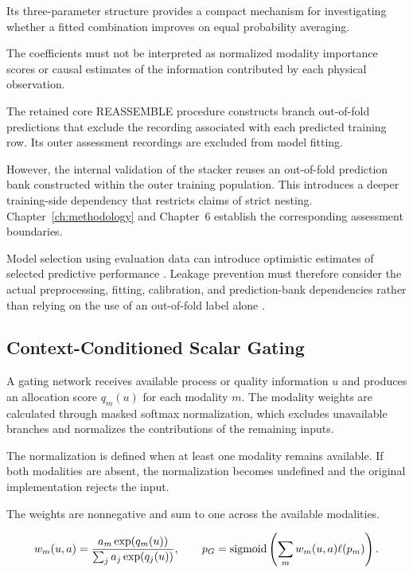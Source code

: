Its three-parameter structure provides a compact mechanism for investigating whether a fitted combination improves on equal probability averaging.

The coefficients must not be interpreted as normalized modality importance scores or causal estimates of the information contributed by each physical observation.

The retained core REASSEMBLE procedure constructs branch out-of-fold predictions that exclude the recording associated with each predicted training row. Its outer assessment recordings are excluded from model fitting.

However, the internal validation of the stacker reuses an out-of-fold prediction bank constructed within the outer training population. This introduces a deeper training-side dependency that restricts claims of strict nesting. Chapter~\ref{ch:methodology} and Chapter~6 establish the corresponding assessment boundaries.

Model selection using evaluation data can introduce optimistic estimates of selected predictive performance \parencite{P004}. Leakage prevention must therefore consider the actual preprocessing, fitting, calibration, and prediction-bank dependencies rather than relying on the use of an out-of-fold label alone \parencite{P017}.

\subsection{Context-Conditioned Scalar Gating}

A gating network receives available process or quality information \(u\) and produces an allocation score \(q_m(u)\) for each modality \(m\). The modality weights are calculated through masked softmax normalization, which excludes unavailable branches and normalizes the contributions of the remaining inputs.

The normalization is defined when at least one modality remains available. If both modalities are absent, the normalization becomes undefined and the original implementation rejects the input.

The weights are nonnegative and sum to one across the available modalities.

\begin{equation}
 w_m(u,a)=\frac{a_m\exp(q_m(u))}{\sum_j a_j\exp(q_j(u))},\qquad
 p_G=\operatorname{sigmoid}\left(\sum_m w_m(u,a)\ell(p_m)\right).
 \label{eq:gate}
\end{equation}

